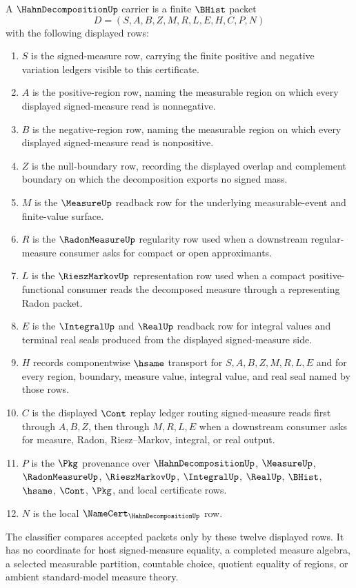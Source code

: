 \begin{definition}
\label{def:hahn-decomposition-carrier}
A $\HahnDecompositionUp$ carrier is a finite $\BHist$ packet
$$
D=(S,A,B,Z,M,R,L,E,H,C,P,N)
$$
with the following displayed rows:
\begin{enumerate}
\item $S$ is the signed-measure row, carrying the finite positive and negative variation ledgers visible to this certificate.
\item $A$ is the positive-region row, naming the measurable region on which every displayed signed-measure read is nonnegative.
\item $B$ is the negative-region row, naming the measurable region on which every displayed signed-measure read is nonpositive.
\item $Z$ is the null-boundary row, recording the displayed overlap and complement boundary on which the decomposition exports no signed mass.
\item $M$ is the $\MeasureUp$ readback row for the underlying measurable-event and finite-value surface.
\item $R$ is the $\RadonMeasureUp$ regularity row used when a downstream regular-measure consumer asks for compact or open approximants.
\item $L$ is the $\RieszMarkovUp$ representation row used when a compact positive-functional consumer reads the decomposed measure through a representing Radon packet.
\item $E$ is the $\IntegralUp$ and $\RealUp$ readback row for integral values and terminal real seals produced from the displayed signed-measure side.
\item $H$ records componentwise $\hsame$ transport for $S,A,B,Z,M,R,L,E$ and for every region, boundary, measure value, integral value, and real seal named by those rows.
\item $C$ is the displayed $\Cont$ replay ledger routing signed-measure reads first through $A,B,Z$, then through $M,R,L,E$ when a downstream consumer asks for measure, Radon, Riesz--Markov, integral, or real output.
\item $P$ is the $\Pkg$ provenance over $\HahnDecompositionUp$, $\MeasureUp$, $\RadonMeasureUp$, $\RieszMarkovUp$, $\IntegralUp$, $\RealUp$, $\BHist$, $\hsame$, $\Cont$, $\Pkg$, and local certificate rows.
\item $N$ is the local $\NameCert_{\HahnDecompositionUp}$ row.
\end{enumerate}
The classifier compares accepted packets only by these twelve displayed rows. It has no coordinate for host signed-measure equality, a completed measure algebra, a selected measurable partition, countable choice, quotient equality of regions, or ambient standard-model measure theory.
\end{definition}

